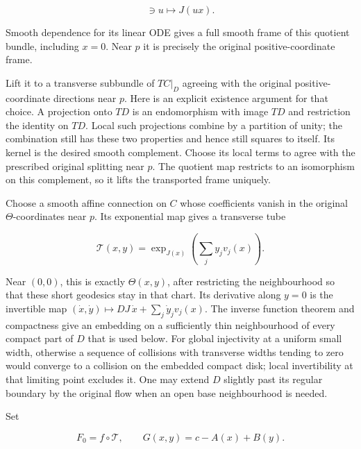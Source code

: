 \begin{equation}
[0,1]\ni u\longmapsto J(ux).
 \label{courseIII:morse-trajectories-and-critical-value-lowering:eq:3.7}
\end{equation}

Smooth dependence for its linear ODE gives a full smooth frame of this quotient bundle, including \(x=0\). Near \(p\) it is precisely the original positive-coordinate frame.

Lift it to a transverse subbundle of \(TC|_D\) agreeing with the original positive-coordinate directions near \(p\). Here is an explicit existence argument for that choice. A projection onto \(TD\) is an endomorphism with image \(TD\) and restriction the identity on \(TD\). Local such projections combine by a partition of unity; the combination still has these two properties and hence still squares to itself. Its kernel is the desired smooth complement. Choose its local terms to agree with the prescribed original splitting near \(p\). The quotient map restricts to an isomorphism on this complement, so it lifts the transported frame uniquely.

Choose a smooth affine connection on \(C\) whose coefficients vanish in the original \(\Theta\)-coordinates near \(p\). Its exponential map gives a transverse tube

\begin{equation}
\mathcal T(x,y)=
 \exp_{J(x)}\!\left(\sum_j y_j v_j(x)\right).
 \label{courseIII:morse-trajectories-and-critical-value-lowering:eq:3.8}
\end{equation}

Near \((0,0)\), this is exactly \(\Theta(x,y)\), after restricting the neighbourhood so that these short geodesics stay in that chart. Its derivative along \(y=0\) is the invertible map
\((\dot x,\dot y)\mapsto DJ\,\dot x+\sum_j\dot y_jv_j(x)\).
The inverse function theorem and compactness give an embedding on a sufficiently thin neighbourhood of every compact part of \(D\) that is used below. For global injectivity at a uniform small width, otherwise a sequence of collisions with transverse widths tending to zero would converge to a collision on the embedded compact disk; local invertibility at that limiting point excludes it. One may extend \(D\) slightly past its regular boundary by the original flow when an open base neighbourhood is needed.

Set

\begin{equation}
F_0=f\circ\mathcal T,\qquad
 G(x,y)=c-A(x)+B(y).
 \label{courseIII:morse-trajectories-and-critical-value-lowering:eq:3.9}
\end{equation}

